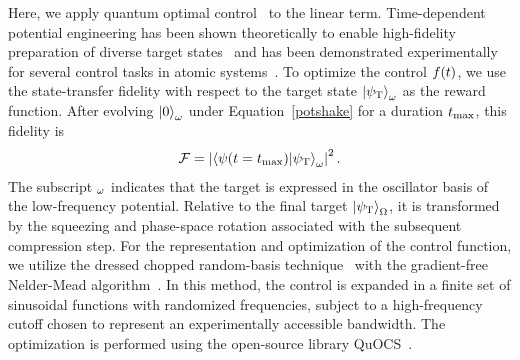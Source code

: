 \documentclass[reprint,prx,footinbib,floatfix,twocolumn,longbibliography,superscriptaddress]{revtex4-2}
\begin{document}
Here, we apply quantum optimal control~\cite{Werschnik2007,Glaser2015,Koch2022} to the linear term.
Time-dependent potential engineering has been shown theoretically to enable high-fidelity preparation of diverse target states~\cite{Grochowski2025a} and has been demonstrated experimentally for several control tasks in atomic systems~\cite{Bucker2011,Bucker2013,vanFrank2016a,Schmidt2020,Dupont2021,Lam2021}.
To optimize the control $f(t)$, we use the state-transfer fidelity with respect to the target state $\ket{\psi_\text{T}}_{\omega}$ as the reward function.
After evolving $\ket{0}_{\omega}$ under Equation~\eqref{potshake} for a duration $t_\text{max}$, this fidelity is
\begin{align}
\mathcal{F} = \left|\braket{\psi(t = t_\text{max})}{\psi_\text{T}}_{\omega} \right|^2.
\end{align}
The subscript ${}_\omega$ indicates that the target is expressed in the oscillator basis of the low-frequency potential.
Relative to the final target $\ket{\psi_\text{T}}_{\Omega}$, it is transformed by the squeezing and phase-space rotation associated with the subsequent compression step.
For the representation and optimization of the control function, we utilize the dressed chopped random-basis technique~\cite{Muller2022} with the gradient-free Nelder-Mead  algorithm~\cite{Nelder1965}.
In this method, the control is expanded in a finite set of sinusoidal functions with randomized frequencies, subject to a high-frequency cutoff chosen to represent an experimentally accessible bandwidth.
The optimization is performed using the open-source library QuOCS~\cite{Rossignolo2023}.
\end{document}
